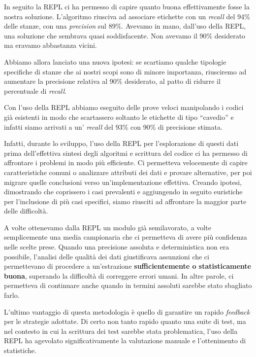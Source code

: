 \documentclass[12pt]{report}
\begin{document}
In seguito la REPL ci ha permesso di capire quanto buona effettivamente fosse la nostra soluzione. L'algoritmo riusciva ad associare etichette con un \textit{recall} del 94\% delle stanze, con una \textit{precision} sul 89\%. Avevamo in mano, dall'uso della REPL, una soluzione che sembrava quasi soddisfacente. Non avevamo il 90\% desiderato ma eravamo abbastanza vicini. 

Abbiamo allora lanciato una nuova ipotesi: se scartiamo qualche tipologie specifiche di stanze che ai nostri scopi sono di minore importanza, riusciremo ad aumentare la precisione relativa al 90\% desiderato, al patto di ridurre il percentuale di \textit{recall}.

Con l'uso della REPL abbiamo eseguito delle prove veloci manipolando i codici già esistenti in modo che scartassero soltanto le etichette di tipo ``cavedio'' e infatti siamo arrivati a un' \textit{recall} del 93\% con 90\% di precisione stimata.

Infatti, durante lo sviluppo, l'uso della REPL per l'esplorazione di questi dati prima dell'effettiva sintesi degli algoritmi e scrittura del codice ci ha permesso di affrontare i problemi in modo più efficiente. Ci permetteva velocemente di capire caratteristiche comuni o analizzare attributi dei dati e provare alternative, per poi migrare quelle conclusioni verso un'implementazione effettiva. Creando ipotesi, dimostrando che coprissero i casi prevalenti e aggiungendo in seguito euristiche per l'inclusione di più casi specifici, siamo riusciti ad affrontare la maggior parte delle difficoltà.

A volte ottenevamo dalla REPL un modulo già semilavorato, a volte semplicemente una media campionaria che ci permetteva di avere più confidenza nelle scelte prese.
Quando una precisione assoluta e deterministica non era possibile, l'analisi delle qualità dei dati giustificava assunzioni che ci permettevano di procedere a un'estrazione \textbf{sufficientemente o statisticamente buona}, superando la difficoltà di correggere errori umani. In altre parole, ci permetteva di continuare anche quando in termini assoluti sarebbe stato sbagliato farlo.

L'ultimo vantaggio di questa metodologia è quello di garantire un rapido \textit{feedback} per le strategie adottate. Di certo non tanto rapido quanto una suite di test, ma nel contesto in cui la scrittura dei test sarebbe stata problematica, l'uso della REPL ha agevolato significativamente la valutazione manuale e l'ottenimento di statistiche.
\end{document}
